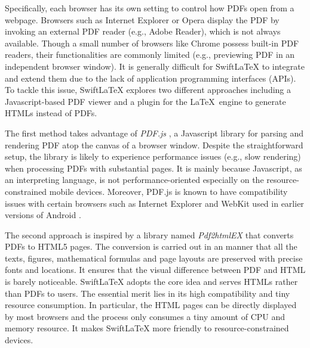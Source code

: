\documentclass[sigconf]{acmart}
\begin{document}
Specifically, each browser has its own setting to control how PDFs open from a webpage. 
Browsers such as Internet Explorer or Opera display the PDF by invoking an external PDF reader (e.g., Adobe Reader), which is not always available.
Though a small number of browsers like Chrome possess built-in PDF readers, their functionalities are commonly limited (e.g., previewing PDF in an independent browser window). 
It is generally difficult for SwiftLaTeX to integrate and extend them due to the lack of application programming interfaces (APIs).
To tackle this issue, SwiftLaTeX explores two different approaches including a Javascript-based PDF viewer and a plugin for the \LaTeX\ engine to generate HTMLs instead of PDFs.

The first method takes advantage of \textit{PDF.js} \cite{pdfjsintro}, a Javascript library for parsing and rendering PDF atop the canvas of a browser window. Despite the straightforward setup, the library is likely to experience performance issues (e.g., slow rendering) when processing PDFs with substantial pages. It is mainly because Javascript, as an interpreting language, is not performance-oriented especially on the resource-constrained mobile devices. Moreover, PDF.js is known to have compatibility issues with certain browsers such as Internet Explorer and WebKit used in earlier versions of Android \cite{pdfjs}.

The second approach is inspired by a library named \textit{Pdf2htmlEX} \cite{wang2013online} that converts PDFs to HTML5 pages.  
The conversion is carried out in an manner that all the texts, figures, mathematical formulas and page layouts are preserved with precise fonts and locations. It ensures that the visual difference between PDF and HTML is barely noticeable.
SwiftLaTeX adopts the core idea and serves HTMLs rather than PDFs to users. The essential merit lies in its high compatibility and tiny resource consumption.
 In particular, the HTML pages can be directly displayed by most browsers and the process only consumes a tiny amount of CPU and memory resource. It makes SwiftLaTeX more friendly to resource-constrained devices.

\end{document}
